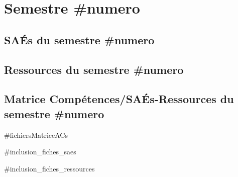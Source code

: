 


\section{Semestre #numero}

\subsection*{SAÉs du semestre #numero}



\subsection*{Ressources du semestre #numero}


\subsection*{Matrice Compétences/SAÉs-Ressources du semestre #numero}

#fichiersMatriceACs
%
%
%
%
\newpage

 \label{subsec:FichesSAES#numero}
\addtocounter{subsection}{1}

#inclusion_fiches_saes

 \label{subsec:FichesRessourcesS#numero}
\addtocounter{subsection}{1}

#inclusion_fiches_ressources